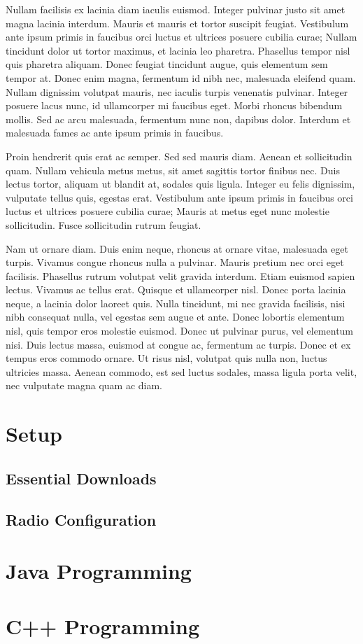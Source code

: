 \documentclass[12pt, letterpaper]{article}
\begin{document}
Nullam facilisis ex lacinia diam iaculis euismod. Integer pulvinar justo sit amet magna lacinia interdum. Mauris et mauris et tortor suscipit feugiat. Vestibulum ante ipsum primis in faucibus orci luctus et ultrices posuere cubilia curae; Nullam tincidunt dolor ut tortor maximus, et lacinia leo pharetra. Phasellus tempor nisl quis pharetra aliquam. Donec feugiat tincidunt augue, quis elementum sem tempor at. Donec enim magna, fermentum id nibh nec, malesuada eleifend quam. Nullam dignissim volutpat mauris, nec iaculis turpis venenatis pulvinar. Integer posuere lacus nunc, id ullamcorper mi faucibus eget. Morbi rhoncus bibendum mollis. Sed ac arcu malesuada, fermentum nunc non, dapibus dolor. Interdum et malesuada fames ac ante ipsum primis in faucibus.

Proin hendrerit quis erat ac semper. Sed sed mauris diam. Aenean et sollicitudin quam. Nullam vehicula metus metus, sit amet sagittis tortor finibus nec. Duis lectus tortor, aliquam ut blandit at, sodales quis ligula. Integer eu felis dignissim, vulputate tellus quis, egestas erat. Vestibulum ante ipsum primis in faucibus orci luctus et ultrices posuere cubilia curae; Mauris at metus eget nunc molestie sollicitudin. Fusce sollicitudin rutrum feugiat.

Nam ut ornare diam. Duis enim neque, rhoncus at ornare vitae, malesuada eget turpis. Vivamus congue rhoncus nulla a pulvinar. Mauris pretium nec orci eget facilisis. Phasellus rutrum volutpat velit gravida interdum. Etiam euismod sapien lectus. Vivamus ac tellus erat. Quisque et ullamcorper nisl. Donec porta lacinia neque, a lacinia dolor laoreet quis. Nulla tincidunt, mi nec gravida facilisis, nisi nibh consequat nulla, vel egestas sem augue et ante. Donec lobortis elementum nisl, quis tempor eros molestie euismod. Donec ut pulvinar purus, vel elementum nisi. Duis lectus massa, euismod at congue ac, fermentum ac turpis. Donec et ex tempus eros commodo ornare. Ut risus nisl, volutpat quis nulla non, luctus ultricies massa. Aenean commodo, est sed luctus sodales, massa ligula porta velit, nec vulputate magna quam ac diam.

\section{Setup}
\subsection{Essential Downloads}
\subsection{Radio Configuration}

\section{Java Programming}
\section{C++ Programming}
\end{document}
